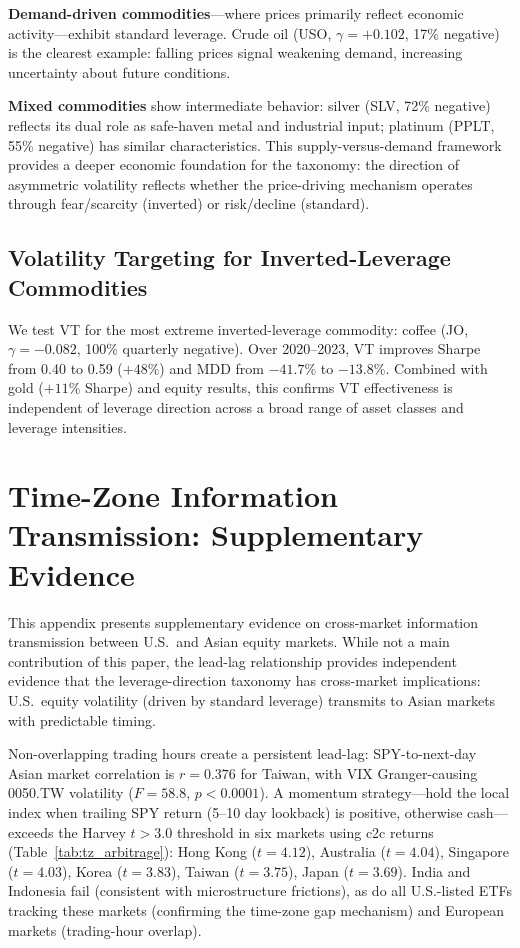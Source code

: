 \textbf{Demand-driven commodities}---where prices primarily reflect economic activity---exhibit standard leverage. Crude oil (USO, $\gamma = +0.102$, 17\% negative) is the clearest example: falling prices signal weakening demand, increasing uncertainty about future conditions.

\textbf{Mixed commodities} show intermediate behavior: silver (SLV, 72\% negative) reflects its dual role as safe-haven metal and industrial input; platinum (PPLT, 55\% negative) has similar characteristics. This supply-versus-demand framework provides a deeper economic foundation for the taxonomy: the direction of asymmetric volatility reflects whether the price-driving mechanism operates through fear/scarcity (inverted) or risk/decline (standard).

\subsection{Volatility Targeting for Inverted-Leverage Commodities}

We test VT for the most extreme inverted-leverage commodity: coffee (JO, $\gamma = -0.082$, 100\% quarterly negative). Over 2020--2023, VT improves Sharpe from 0.40 to 0.59 ($+48\%$) and MDD from $-41.7\%$ to $-13.8\%$. Combined with gold ($+11\%$ Sharpe) and equity results, this confirms VT effectiveness is independent of leverage direction across a broad range of asset classes and leverage intensities.


\section{Time-Zone Information Transmission: Supplementary Evidence}
\label{sec:tz_arbitrage}

This appendix presents supplementary evidence on cross-market information transmission between U.S.\ and Asian equity markets. While not a main contribution of this paper, the lead-lag relationship provides independent evidence that the leverage-direction taxonomy has cross-market implications: U.S.\ equity volatility (driven by standard leverage) transmits to Asian markets with predictable timing.

Non-overlapping trading hours create a persistent lead-lag: SPY-to-next-day Asian market correlation is $r = 0.376$ for Taiwan, with VIX Granger-causing 0050.TW volatility ($F = 58.8$, $p < 0.0001$). A momentum strategy---hold the local index when trailing SPY return (5--10 day lookback) is positive, otherwise cash---exceeds the Harvey $t > 3.0$ threshold in six markets using c2c returns (Table~\ref{tab:tz_arbitrage}): Hong Kong ($t = 4.12$), Australia ($t = 4.04$), Singapore ($t = 4.03$), Korea ($t = 3.83$), Taiwan ($t = 3.75$), Japan ($t = 3.69$). India and Indonesia fail (consistent with microstructure frictions), as do all U.S.-listed ETFs tracking these markets (confirming the time-zone gap mechanism) and European markets (trading-hour overlap).

